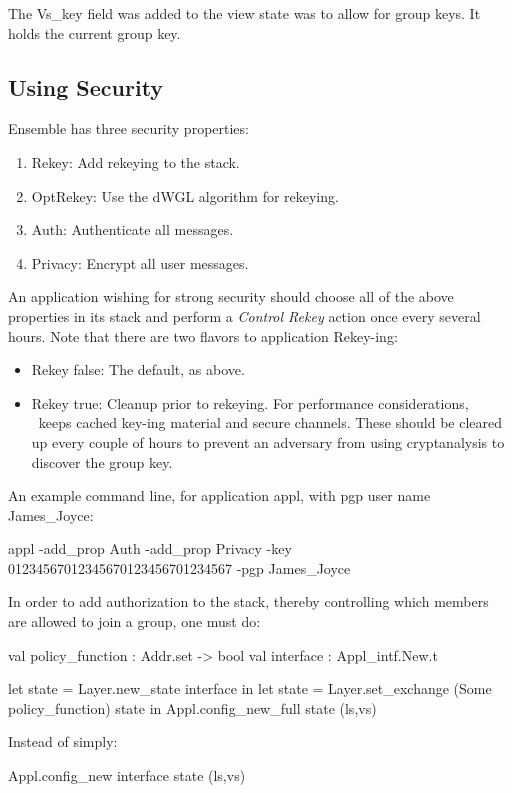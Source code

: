 The Vs\_key field was added to the view state was to allow for group keys.
It holds the current group key.

\subsection{Using Security}
Ensemble has three security properties:
\begin{enumerate}
\item 
{Rekey:} Add rekeying to the stack.
\item 
{OptRekey:} Use the dWGL algorithm for rekeying. 
\item
{Auth:} Authenticate all messages.
\item 
{Privacy:} Encrypt all user messages.
\end{enumerate}

An application wishing for strong security should choose all of the
above properties in its stack and perform a {\it Control Rekey} action
once every several hours. Note that there are two flavors to
application Rekey-ing:
\begin{itemize}
\item{Rekey false:} The default, as above.
\item{Rekey true:} Cleanup prior to rekeying. For performance
considerations, \ensemble\ keeps cached key-ing material and secure
channels. These should be cleared up every couple of hours to prevent
an adversary from using cryptanalysis to discover the group key. 
\end{itemize}

An example command line, for application appl, with pgp user name James\_Joyce:
\begin{codebox}
appl -add\_prop Auth -add\_prop Privacy -key 01234567012345670123456701234567 
     -pgp James\_Joyce
\end{codebox}

In order to add authorization to the stack, thereby controlling which
members are allowed to join a group, one must do:

\begin{codebox}
  val policy_function : Addr.set -> bool
  val interface : Appl_intf.New.t

  let state = Layer.new_state interface in
  let state = Layer.set_exchange (Some policy_function) state in 
  Appl.config_new_full state (ls,vs)
\end{codebox}

Instead of simply:
\begin{codebox}
  Appl.config_new interface state (ls,vs)
\end{codebox}

